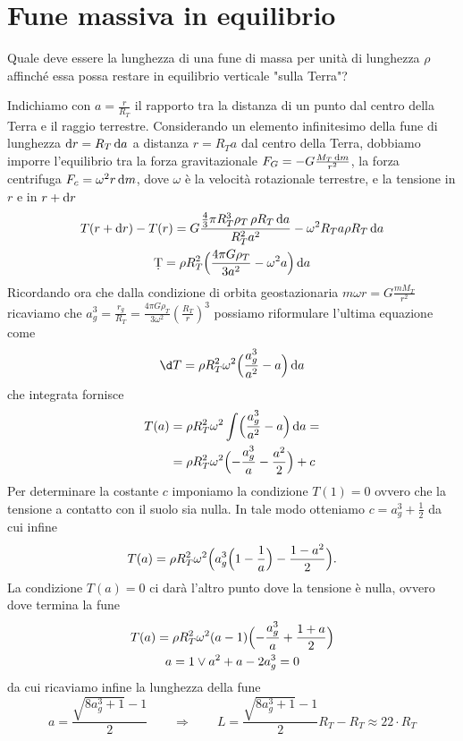 \section{Fune massiva in equilibrio}
\begin{testo}
	Quale deve essere la lunghezza di una fune di massa per unità di lunghezza $ \rho $ affinché essa possa restare in equilibrio verticale "sulla Terra"?
\end{testo}
\begin{sol}
	Indichiamo con $ a = \frac{r}{R_T} $ il rapporto tra la distanza di un punto dal centro della Terra e il raggio terrestre. Considerando un elemento infinitesimo della fune di lunghezza $ \dif{r} = R_T \dif{a} $ a distanza $ r = R_T a $ dal centro della Terra, dobbiamo imporre l'equilibrio tra la forza gravitazionale $ F_G = - G \frac{M_T \dif{m} }{r^2} $, la forza centrifuga $ F_c = \omega^2 r \dif{m} $, dove $ \omega $ è la velocità rotazionale terrestre, e la tensione in $ r $ e in $ r + \dif{r} $
	\begin{gather*}
	T(r + \dif{r}) - T(r) = G \frac{\frac{4}{3} \pi R_T^3 \rho_T \,  \rho R_T \dif{a} }{R_T^2 a^2} - \omega^2 R_T a \rho R_T \dif{a} \\
	\d T = \rho R_T^2 \Bigl( \frac{4 \pi G \rho_T}{3 a^2} - \omega^2 a \Bigr) \dif{a}
	\end{gather*}
	Ricordando ora che dalla condizione di orbita geostazionaria $ m \omega r = G \frac{m M_T}{r^2} $ ricaviamo che $ a_g^3 = \frac{r_g}{R_T} = \frac{4 \pi G \rho_T}{3\omega^2} (\frac{R_T}{r})^3 $ possiamo riformulare l'ultima equazione come 
	\[\d T = \rho R_T^2 \omega^2 \Bigl( \frac{a_g^3}{a^2} - a \Bigr) \dif{a}\]
	che integrata fornisce 
	\begin{align*}
	T(a) & = \rho R_T^2 \omega^2  \int \Bigl( \frac{a_g^3}{a^2} - a \Bigr) \dif{a} = \\
	& = \rho R_T^2 \omega^2 \Bigl( - \frac{a_g^3}{a} - \frac{a^2}{2} \Bigr) + c
	\end{align*}
	Per determinare la costante $ c $ imponiamo la condizione $ T(1) = 0 $ ovvero che la tensione a contatto con il suolo sia nulla. In tale modo otteniamo $ c = a_g^3 + \frac{1}{2} $ da cui infine
	\begin{equation}
	T(a) = \rho R_T^2 \omega^2 \Bigl( a_g^3 \Bigl(1 - \frac{1}{a} \Bigr) - \frac{1 - a^2}{2} \Bigr).
	\end{equation}
	La condizione $ T(a) = 0 $ ci darà l'altro punto dove la tensione è nulla, ovvero dove termina la fune
	\begin{gather*}
	T(a) = \rho R_T^2 \omega^2 (a - 1) \Bigl( - \frac{a_g^3}{a} + \frac{1 + a}{2} \Bigr) \\
	a = 1 \vee a^2 + a - 2 a_g^3 = 0
	\end{gather*}
	da cui ricaviamo infine la lunghezza della fune
	\begin{equation}
	a = \frac{\sqrt{8 a_g^3 + 1} - 1}{2} \qquad \Rightarrow \qquad L = \frac{\sqrt{8 a_g^3 + 1} - 1}{2} R_T - R_T \approx 22 \cdot R_T
	\end{equation}
\end{sol}
